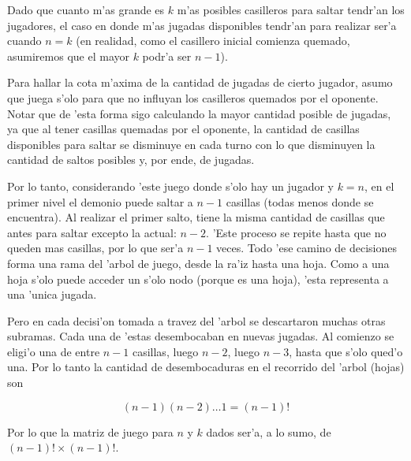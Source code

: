 Dado que cuanto m'as grande es $k$ m'as posibles casilleros para saltar tendr'an los jugadores, el caso en donde m'as jugadas disponibles tendr'an para realizar ser'a cuando $n = k$ (en realidad, como el casillero inicial comienza quemado, asumiremos que el mayor $k$ podr'a ser $n-1$).

Para hallar la cota m'axima de la cantidad de jugadas de cierto jugador, asumo que juega s'olo para que no influyan los casilleros quemados por el oponente. Notar que de 'esta forma sigo calculando la mayor cantidad posible de jugadas, ya que al tener casillas quemadas por el oponente, la cantidad de casillas disponibles para saltar se disminuye en cada turno con lo que disminuyen la cantidad de saltos posibles y, por ende, de jugadas.

Por lo tanto, considerando 'este juego donde s'olo hay un jugador y $k=n$, en el primer nivel el demonio puede saltar a $n-1$ casillas (todas menos donde se encuentra). Al realizar el primer salto, tiene la misma cantidad de casillas que antes para saltar excepto la actual: $n-2$. 'Este proceso se repite hasta que no queden mas casillas, por lo que ser'a $n-1$ veces. Todo 'ese camino de decisiones forma una rama del 'arbol de juego, desde la ra'iz hasta una hoja. Como a una hoja s'olo puede acceder un s'olo nodo (porque es una hoja), 'esta representa a una 'unica jugada. 

Pero en cada decisi'on tomada a travez del 'arbol se descartaron muchas otras subramas. Cada una de 'estas desembocaban en nuevas jugadas. Al comienzo se eligi'o una de entre $n-1$ casillas, luego $n-2$, luego $n-3$, hasta que s'olo qued'o una. Por lo tanto la cantidad de desembocaduras en el recorrido del 'arbol (hojas) son

$$(n-1)(n-2)\dots 1 = (n-1)! $$

Por lo que la matriz de juego para $n$ y $k$ dados ser'a, a lo sumo, de $(n-1)!\times (n-1)!$.



